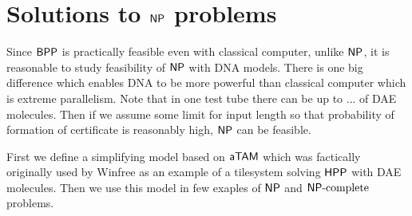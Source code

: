 \chapter{Solutions to $\mathsf{NP}$ problems}   %
\label{chap:problems}

Since $\mathsf{BPP}$ is practically feasible even with classical computer, unlike $\mathsf{NP}$, it is reasonable to study feasibility of $\mathsf{NP}$ with DNA models. There is one big difference which enables DNA to be more powerful than classical computer which is extreme parallelism. Note that in one test tube there can be up to ... %
of DAE molecules. %
Then if we assume some limit for input length so that probability of formation of certificate is reasonably high, $\mathsf{NP}$ can be feasible. %

First we define a simplifying model based on $\mathsf{aTAM}$ which was factically originally used by Winfree \cite{winfree_phd} as an example of a tilesystem solving $\sf HPP$ with DAE molecules. Then we use this model in few exaples of $\mathsf{NP}$ and $\mathsf{NP}\textnormal{-complete}$ problems.





\newpage


\newpage

